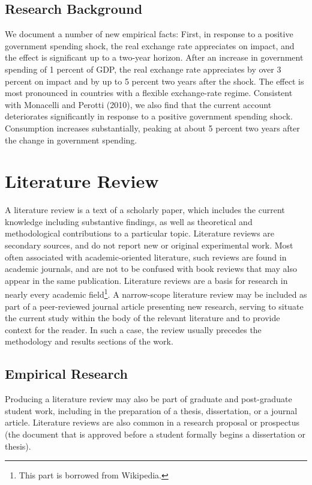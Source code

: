 \documentclass{ZJSUthesis}
\begin{document}
\subsection{Research Background}
We document a number of new empirical facts: First, in response to a positive government
spending shock, the real exchange rate appreciates on impact, and the effect is significant up to a
two-year horizon. After an increase in government spending of 1 percent of GDP, the real exchange
rate appreciates by over 3 percent on impact and by up to 5 percent two years after the shock.
The effect is most pronounced in countries with a flexible exchange-rate regime. Consistent with
Monacelli and Perotti (2010), we also find that the current account deteriorates significantly in
response to a positive government spending shock. Consumption increases substantially, peaking
at about 5 percent two years after the change in government spending.


\section{Literature Review}
A literature review is a text of a scholarly paper, which includes the current knowledge including substantive findings, as well as theoretical and methodological contributions to a particular topic. Literature reviews are secondary sources, and do not report new or original experimental work. Most often associated with academic-oriented literature, such reviews are found in academic journals, and are not to be confused with book reviews that may also appear in the same publication. Literature reviews are a basis for research in nearly every academic field\footnote{This part is borrowed from Wikipedia.}. A narrow-scope literature review may be included as part of a peer-reviewed journal article presenting new research, serving to situate the current study within the body of the relevant literature and to provide context for the reader. In such a case, the review usually precedes the methodology and results sections of the work.

\subsection{Empirical Research}
Producing a literature review may also be part of graduate and post-graduate student work, including in the preparation of a thesis, dissertation, or a journal article. Literature reviews are also common in a research proposal or prospectus (the document that is approved before a student formally begins a dissertation or thesis).
\end{document}
